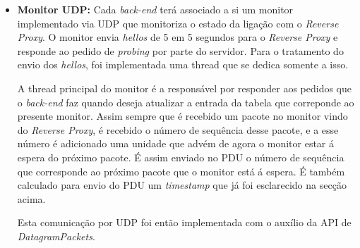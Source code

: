 \documentclass{llncs}
\begin{document}
\begin{itemize}
	\setlength\itemsep{1em}
	\setlength{\parindent}{1cm}
\item \textbf{Monitor UDP:} Cada \textit{back-end} terá associado a si um monitor implementado via UDP que monitoriza o estado da ligação com o \textit{Reverse Proxy}. O monitor envia \textit{hellos} de 5 em 5 segundos para o \textit{Reverse Proxy} e responde ao pedido de \textit{probing} por parte do servidor. Para o tratamento do envio dos \textit{hellos}, foi implementada uma thread que se dedica somente a isso.\par
	A thread principal do monitor é a responsável por responder aos pedidos que o \textit{back-end} faz quando deseja atualizar a entrada da tabela que correponde ao presente monitor. Assim sempre que é recebido um pacote no monitor vindo do \textit{Reverse Proxy}, é recebido o número de sequência desse pacote, e a esse número é adicionado uma unidade que advém de agora o monitor estar á espera do próximo pacote. É assim enviado no PDU o número de sequência que corresponde ao próximo pacote que o monitor está á espera. É também calculado para envio do PDU um \textit{timestamp} que já foi esclarecido na secção acima.\par
	Esta comunicação por UDP foi então implementada com o auxílio da API de \textit{DatagramPackets}.
	

\end{itemize}
\end{document}
